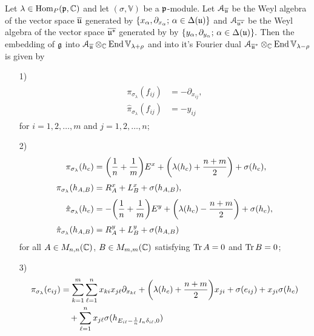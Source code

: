 \begin{theorem}\label{thm:action AGS}
Let $\lambda \in \mathrm{Hom}_P(\mathfrak{p},\mathbb{C})$ and let $(\sigma,\mathbb{V})$ be a $\mathfrak{p}$-module. Let $\EuScript{A}_{\overline{\mathfrak{u}}}$ be the Weyl algebra of the vector space $\overline{\mathfrak{u}}$ generated by $\{x_\alpha,\partial_{x_\alpha};\, \alpha \in \Delta(\mathfrak{u})\}$ and $\EuScript{A}_{\overline{\mathfrak{u}^*}}$ be the Weyl algebra of the vector space $\overline{\mathfrak{u}^*}$ generated by by $\{y_\alpha,\partial_{y_\alpha};\, \alpha \in \Delta(\mathfrak{u})\}.$  Then the embedding of $\mathfrak{g}$ into $\EuScript{A}_{\overline{\mathfrak{u}}} \otimes_{\mathbb{C}} \mathop {\rm End} \nolimits \mathbb{V}_{\lambda+\rho}$ and into it's Fourier dual $\EuScript{A}_{\overline{\mathfrak{u}}^*} \otimes_{\mathbb{C}} \mathop {\rm End} \nolimits \mathbb{V}_{\lambda-\rho}$ is given by
\begin{enumerate}
\item[1)]
\begin{align}
\begin{aligned}
  \pi_{\sigma_\lambda}(f_{ij})&=-\partial_{x_{ij}}, \\
  \hat{\pi}_{\sigma_\lambda}(f_{ij})&=-y_{ij}
\end{aligned}
\end{align}
for $i=1,2,\dots,m$ and $j=1,2,\dots,n$;
\item[2)]
\begin{align}
  \begin{aligned}
    \pi_{\sigma_\lambda}(h_c)&= \bigg({1 \over n} + {1 \over m}\bigg) E^x + \bigg(\lambda(h_c)+ {n+m \over 2}\bigg) + \sigma(h_c), \\[1mm]
    \pi_{\sigma_\lambda}(h_{A,B})&= R_A^x +L_B^x + \sigma(h_{A,B}), \\[1mm]
    \hat{\pi}_{\sigma_\lambda}(h_c)&= -\bigg({1 \over n} + {1 \over m}\bigg) E^y +  \bigg(\lambda(h_c) - {n+m \over 2}\bigg) + \sigma(h_c), \\[1mm]
    \hat{\pi}_{\sigma_\lambda}(h_{A,B})&= R_A^y + L_B^y + \sigma(h_{A,B})
  \end{aligned}
\end{align}
for all $A \in M_{n,n}(\mathbb{C})$, $B \in M_{m,m}(\mathbb{C})$ satisfying $\operatorname{\mathrm{Tr}} A =0$ and $\operatorname{\mathrm{Tr}} B = 0$;
\item[3)]
\begin{align}
  \begin{aligned}
    \pi_{\sigma_\lambda}(e_{ij})&= \sum_{k=1}^m \sum_{\ell=1}^n x_{ki} x_{j\ell} \partial_{x_{k\ell}}  + \bigg(\lambda(h_c)+ {n+m \over 2}\bigg) x_{ji} + \sigma(e_{ij}) + x_{ji}\sigma(h_c)
    \\ &\quad + \sum_{\ell=1}^n x_{j\ell} \sigma(h_{E_{i\ell}-{1\over n}I_n \delta_{i \ell},0})

\end{aligned}
\end{align}
\end{enumerate}
\end{theorem}
